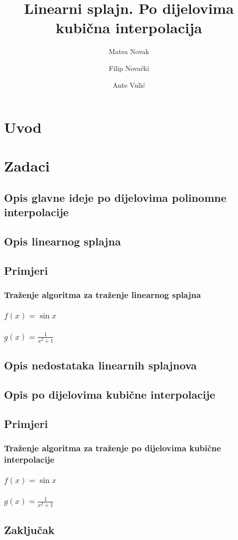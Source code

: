 \documentclass[12pt,a4paper]{report}
\author{Matea Novak \and Filip Novački \and Ante Vulić}
\title{Linearni splajn. Po dijelovima kubična interpolacija}
\begin{document}
	\maketitle
	
	\tableofcontents
	
\chapter{Uvod}

\chapter{Zadaci}
	\section{Opis glavne ideje po dijelovima polinomne interpolacije}
	\section{Opis linearnog splajna}
	\section{Primjeri}
		\subsection{Traženje algoritma za traženje linearnog splajna}
		\subsection{$f(x)=\sin x$}
		\subsection{$g(x)=\frac{1}{x^2 +1}$}
	\section{Opis nedostataka linearnih splajnova}
	\section{Opis po dijelovima kubične interpolacije}
	\section{Primjeri}
		\subsection{Traženje algoritma za traženje po dijelovima kubične interpolacije}
		\subsection{$f(x)=\sin x$}
		\subsection{$g(x)=\frac{1}{x^2 +1}$}
	\section{Zaključak}
\end{document}
